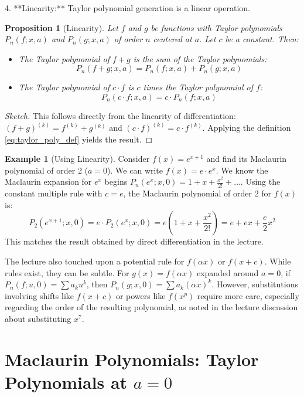 \documentclass[11pt]{article}
\newtheorem{proposition}[theorem]{Proposition}
\theoremstyle{definition}
\newtheorem{example}[theorem]{Example}
\theoremstyle{remark}
\begin{document}
4.  **Linearity:** Taylor polynomial generation is a linear operation.
    \begin{proposition}[Linearity]
    Let $f$ and $g$ be functions with Taylor polynomials $P_n(f; x, a)$ and $P_n(g; x, a)$ of order $n$ centered at $a$. Let $c$ be a constant. Then:
    \begin{itemize}
        \item The Taylor polynomial of $f+g$ is the sum of the Taylor polynomials:
          \[ P_n(f+g; x, a) = P_n(f; x, a) + P_n(g; x, a) \]
        \item The Taylor polynomial of $c \cdot f$ is $c$ times the Taylor polynomial of $f$:
          \[ P_n(c \cdot f; x, a) = c \cdot P_n(f; x, a) \]
    \end{itemize}
    \end{proposition}
    \begin{proof}[Sketch]
    This follows directly from the linearity of differentiation: $(f+g)^{(k)} = f^{(k)} + g^{(k)}$ and $(c \cdot f)^{(k)} = c \cdot f^{(k)}$. Applying the definition \eqref{eq:taylor_poly_def} yields the result.
    \end{proof}

    \begin{example}[Using Linearity]
    Consider $f(x) = e^{x+1}$ and find its Maclaurin polynomial of order 2 ($a=0$).
    We can write $f(x) = e \cdot e^x$. We know the Maclaurin expansion for $e^x$ begins $P_n(e^x; x, 0) = 1 + x + \frac{x^2}{2!} + \dots$.
    Using the constant multiple rule with $c=e$, the Maclaurin polynomial of order 2 for $f(x)$ is:
    \[ P_2(e^{x+1}; x, 0) = e \cdot P_2(e^x; x, 0) = e \left( 1 + x + \frac{x^2}{2!} \right) = e + ex + \frac{e}{2}x^2 \]
    This matches the result obtained by direct differentiation in the lecture.

    The lecture also touched upon a potential rule for $f(\alpha x)$ or $f(x+c)$. While rules exist, they can be subtle. For $g(x) = f(\alpha x)$ expanded around $a=0$, if $P_n(f; u, 0) = \sum a_k u^k$, then $P_n(g; x, 0) = \sum a_k (\alpha x)^k$. However, substitutions involving shifts like $f(x+c)$ or powers like $f(x^p)$ require more care, especially regarding the order of the resulting polynomial, as noted in the lecture discussion about substituting $x^7$.
    \end{example}

\section{Maclaurin Polynomials: Taylor Polynomials at \texorpdfstring{$a=0$}{a=0}}
\end{document}
